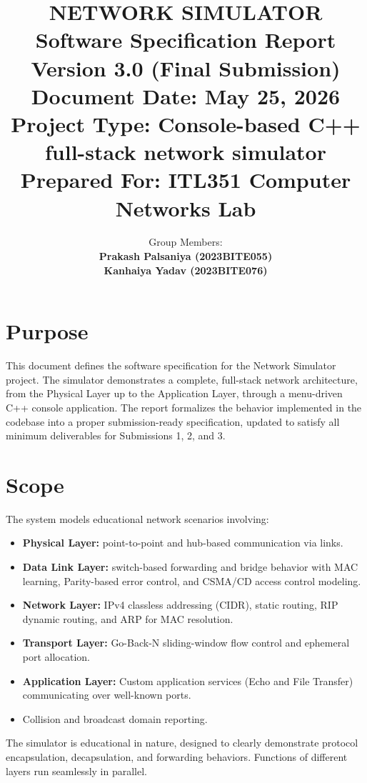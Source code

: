 \documentclass[12pt,a4paper]{article}
\title{
    \vspace{1.5in}
    \Huge \textbf{NETWORK SIMULATOR} \\
    \vspace{0.5in}
    \Large \textbf{Software Specification Report} \\
    \vspace{0.5in}
    \large Version 3.0 (Final Submission) \\
    \vspace{0.5in}
    \normalsize Document Date: May 25, 2026 \\
    \vspace{0.2in}
    \normalsize Project Type: Console-based C++ full-stack network simulator \\
    \vspace{0.2in}
    \normalsize Prepared For: ITL351 Computer Networks Lab \\
    \vfill
}
\author{Group Members: \\ \textbf{Prakash Palsaniya (2023BITE055)} \\ \textbf{Kanhaiya Yadav (2023BITE076)}}
\date{}
\begin{document}
\maketitle
\thispagestyle{empty}
\newpage

\tableofcontents
\newpage

\section{Purpose}
This document defines the software specification for the Network Simulator project. The simulator demonstrates a complete, full-stack network architecture, from the Physical Layer up to the Application Layer, through a menu-driven C++ console application. The report formalizes the behavior implemented in the codebase into a proper submission-ready specification, updated to satisfy all minimum deliverables for Submissions 1, 2, and 3.

\section{Scope}
The system models educational network scenarios involving:
\begin{itemize}
    \item \textbf{Physical Layer:} point-to-point and hub-based communication via links.
    \item \textbf{Data Link Layer:} switch-based forwarding and bridge behavior with MAC learning, Parity-based error control, and CSMA/CD access control modeling.
    \item \textbf{Network Layer:} IPv4 classless addressing (CIDR), static routing, RIP dynamic routing, and ARP for MAC resolution.
    \item \textbf{Transport Layer:} Go-Back-N sliding-window flow control and ephemeral port allocation.
    \item \textbf{Application Layer:} Custom application services (Echo and File Transfer) communicating over well-known ports.
    \item Collision and broadcast domain reporting.
\end{itemize}
The simulator is educational in nature, designed to clearly demonstrate protocol encapsulation, decapsulation, and forwarding behaviors. Functions of different layers run seamlessly in parallel.
\end{document}
